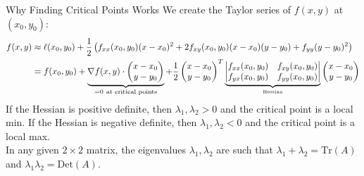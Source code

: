 \documentclass[8pt]{extarticle}
\begin{document}
  \begin{problem}{Why Finding Critical Points Works}
    We create the Taylor series of $f(x,y)$ at $(x_0,y_0)$:
    \begin{align*}
      f(x,y) &\approx \ell(x_0,y_0) + \frac{1}{2}\left(f_{xx}(x_0,y_0)(x-x_0)^2 + 2f_{xy}(x_0,y_0)(x-x_0)(y-y_0) + f_{yy}(y-y_0)^2\right)\\
             &= f(x_0,y_0) + \underbrace{\nabla f(x,y) \cdot \begin{pmatrix}x-x_0\\y-y_0\end{pmatrix}}_{=0~\text{at critical points}} + \frac{1}{2} \begin{pmatrix}x-x_0 \\ y-y_0\end{pmatrix}^{T} \underbrace{\begin{vmatrix}f_{xx}(x_0,y_0) & f_{xy}(x_0,y_0) \\ f_{yx}(x_0,y_0) & f_{yy}(x_0,y_0)\end{vmatrix}}_{\text{\tiny Hessian}} \begin{pmatrix}x-x_0\\y-y_0\end{pmatrix}
    \end{align*}
    If the Hessian is positive definite, then $\lambda_1,\lambda_2 > 0$ and the critical point is a local min. If the Hessian is negative definite, then $\lambda_1,\lambda_2 < 0$ and the critical point is a local max.\\

    In any given $2\times 2$ matrix, the eigenvalues $\lambda_1,\lambda_2$ are such that $\lambda_1 + \lambda_2 = \text{Tr}(A)$ and $\lambda_1\lambda_2 = \text{Det}(A)$.
  \end{problem}
\end{document}
